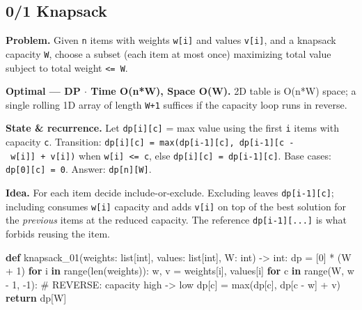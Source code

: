 \documentclass[11pt]{article}
\newenvironment{Shaded}{\begin{snugshade}}{\end{snugshade}}
\newcommand{\BuiltInTok}[1]{\textcolor[rgb]{0.50,0.55,0.55}{#1}}
\newcommand{\CommentTok}[1]{\textcolor[rgb]{0.48,0.49,0.49}{#1}}
\newcommand{\ControlFlowTok}[1]{\textcolor[rgb]{0.99,0.74,0.29}{\textbf{#1}}}
\newcommand{\DecValTok}[1]{\textcolor[rgb]{0.96,0.45,0.00}{#1}}
\newcommand{\KeywordTok}[1]{\textcolor[rgb]{0.81,0.81,0.76}{\textbf{#1}}}
\newcommand{\NormalTok}[1]{\textcolor[rgb]{0.81,0.81,0.76}{#1}}
\newcommand{\OperatorTok}[1]{\textcolor[rgb]{0.81,0.81,0.76}{#1}}
\begin{document}
\subsection{0/1 Knapsack}\label{01-knapsack}

\textbf{Problem.} Given \texttt{n} items with weights \texttt{w{[}i{]}} and values \texttt{v{[}i{]}}, and a knapsack capacity \texttt{W}, choose a subset (each item at most once) maximizing total value subject to total weight \texttt{\textless{}=\ W}.

\textbf{Optimal --- DP \(\cdot\) Time O(n*W), Space O(W).} 2D table is O(n*W) space; a single rolling 1D array of length \texttt{W+1} suffices if the capacity loop runs in reverse.

\textbf{State \& recurrence.} Let \texttt{dp{[}i{]}{[}c{]}} = max value using the first \texttt{i} items with capacity \texttt{c}. Transition: \texttt{dp{[}i{]}{[}c{]}\ =\ max(dp{[}i-1{]}{[}c{]},\ dp{[}i-1{]}{[}c\ -\ w{[}i{]}{]}\ +\ v{[}i{]})} when \texttt{w{[}i{]}\ \textless{}=\ c}, else \texttt{dp{[}i{]}{[}c{]}\ =\ dp{[}i-1{]}{[}c{]}}. Base cases: \texttt{dp{[}0{]}{[}c{]}\ =\ 0}. Answer: \texttt{dp{[}n{]}{[}W{]}}.

\textbf{Idea.} For each item decide include-or-exclude. Excluding leaves \texttt{dp{[}i-1{]}{[}c{]}}; including consumes \texttt{w{[}i{]}} capacity and adds \texttt{v{[}i{]}} on top of the best solution for the \emph{previous} items at the reduced capacity. The reference \texttt{dp{[}i-1{]}{[}...{]}} is what forbids reusing the item.


\begin{Shaded}
\begin{Highlighting}[]
\KeywordTok{def}\NormalTok{ knapsack\_01(weights: }\BuiltInTok{list}\NormalTok{[}\BuiltInTok{int}\NormalTok{], values: }\BuiltInTok{list}\NormalTok{[}\BuiltInTok{int}\NormalTok{], W: }\BuiltInTok{int}\NormalTok{) }\OperatorTok{{-}\textgreater{}} \BuiltInTok{int}\NormalTok{:}
\NormalTok{    dp }\OperatorTok{=}\NormalTok{ [}\DecValTok{0}\NormalTok{] }\OperatorTok{*}\NormalTok{ (W }\OperatorTok{+} \DecValTok{1}\NormalTok{)}
    \ControlFlowTok{for}\NormalTok{ i }\KeywordTok{in} \BuiltInTok{range}\NormalTok{(}\BuiltInTok{len}\NormalTok{(weights)):}
\NormalTok{        w, v }\OperatorTok{=}\NormalTok{ weights[i], values[i]}
        \ControlFlowTok{for}\NormalTok{ c }\KeywordTok{in} \BuiltInTok{range}\NormalTok{(W, w }\OperatorTok{{-}} \DecValTok{1}\NormalTok{, }\OperatorTok{{-}}\DecValTok{1}\NormalTok{):      }\CommentTok{\# REVERSE: capacity high {-}\textgreater{} low}
\NormalTok{            dp[c] }\OperatorTok{=} \BuiltInTok{max}\NormalTok{(dp[c], dp[c }\OperatorTok{{-}}\NormalTok{ w] }\OperatorTok{+}\NormalTok{ v)}
    \ControlFlowTok{return}\NormalTok{ dp[W]}
\end{Highlighting}
\end{Shaded}
\end{document}

